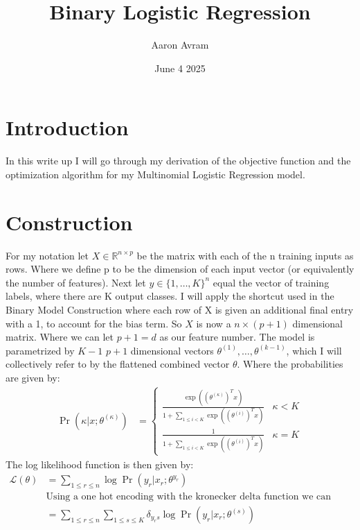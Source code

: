 \documentclass[12pt]{article}
\title{Binary Logistic Regression}
\author{Aaron Avram}
\date{June 4 2025}
\begin{document}
\maketitle

\section*{Introduction}
In this write up I will go through my derivation of the objective function and the optimization algorithm for my Multinomial
Logistic Regression model.

\section*{Construction}
For my notation let $X \in \mathbb{R}^{n \times p}$ be the matrix
with each of the n training inputs as rows. Where we define p to be the dimension
of each input vector (or equivalently the number of features). Next
let $y \in \{1, \ldots, K \}^n$ equal the vector of training labels, where there are K
output classes. I will apply the shortcut used in the Binary Model Construction
where each row of X is given an additional final entry with a 1, to account for the bias term. So $X$
is now a $n \times (p+1)$ dimensional matrix. Where we can let $p + 1 = d$ as our feature number. The model is parametrized by $K - 1$
$p + 1$ dimensional vectors $\theta^{(1)}, \ldots, \theta^{(k-1)}$, which I will collectively refer to by the
flattened combined vector $\theta$. Where the probabilities
are given by:
\begin{align*}
    \Pr(\kappa | x; \theta^{(\kappa)}) &= \begin{cases}
        \frac{\exp((\theta^{(\kappa)})^Tx)}{1 + \displaystyle \sum_{1 \leq i < K}\exp((\theta^{(i)})^Tx)} & \kappa < K \\
        \frac{1}{1 + \displaystyle \sum_{1 \leq i < K}\exp((\theta^{(i)})^Tx)} & \kappa = K
    \end{cases}
\end{align*}
The log likelihood function is then given by:
\begin{align*}
    \mathcal{L}(\theta) &= \displaystyle \sum_{1 \leq r \leq n}\log\Pr(y_r | x_r; \theta^{y_r}) \\
    &\text{Using a one hot encoding with the kronecker delta function we can write this as: } \\
    &= \displaystyle \sum_{1 \leq r \leq n} \sum_{1 \leq s \leq K}\delta_{y_rs}\log\Pr(y_r | x_r; \theta^{(s)}) \\
\end{align*}
\end{document}

